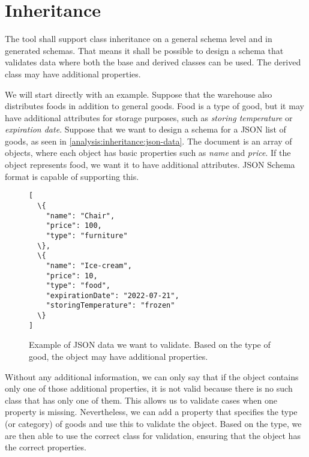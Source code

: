 

\section{Inheritance}

\begin{requirement}
    The tool shall support class inheritance on a general schema level and in generated schemas. That means it shall be possible to design a schema that validates data where both the base and derived classes can be used. The derived class may have additional properties.
    \label{requirement:inheritance}
\end{requirement}

\begin{showcase}
  We will start directly with an example. Suppose that the warehouse also distributes foods in addition to general goods. Food is a type of good, but it may have additional attributes for storage purposes, such as \textit{storing temperature} or \textit{expiration date}. Suppose that we want to design a schema for a JSON list of goods, as seen in \autoref{analysis:inheritance:json-data}. The document is an array of objects, where each object has basic properties such as \textit{name} and \textit{price}. If the object represents food, we want it to have additional attributes. JSON Schema format is capable of supporting this. %

  \begin{figure}[H]\centering
      \begin{Verbatim}[commandchars=\\\{\}]
[
  \{
    "name": "Chair",
    "price": 100,
    "type": "furniture"
  \},
  \{
    "name": "Ice-cream",
    "price": 10,
    "type": "food",
    "expirationDate": "2022-07-21",
    "storingTemperature": "frozen"
  \}
]
      \end{Verbatim}
      \caption{Example of JSON data we want to validate. Based on the type of good, the object may have additional properties.}
      \label{analysis:inheritance:json-data}
  \end{figure}

  Without any additional information, we can only say that if the object contains only one of those additional properties, it is not valid because there is no such class that has only one of them. This allows us to validate cases when one property is missing. Nevertheless, we can add a property that specifies the type (or category) of goods and use this to validate the object. Based on the type, we are then able to use the correct class for validation, ensuring that the object has the correct properties.
\end{showcase}

